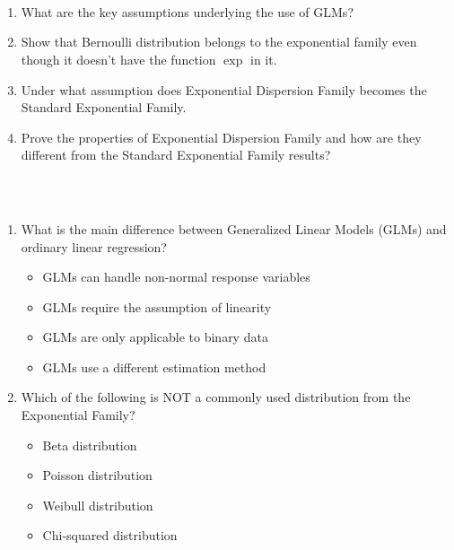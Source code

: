 \documentclass{homework}
\begin{document}
\section{}
\subsection{}\hfill \\
\begin{enumerate}
    \item What are the key assumptions underlying the use of GLMs?
     \item Show that Bernoulli distribution belongs to the exponential family even though it doesn't have the function $\exp$ in it. 
    \item Under what assumption does Exponential Dispersion Family becomes the Standard Exponential Family.
    \item Prove the properties of Exponential Dispersion Family and how are they different from the Standard Exponential Family results?
\end{enumerate}
\subsection{}\hfill \\
\begin{enumerate}
    \item What is the main difference between Generalized Linear Models (GLMs) and ordinary linear regression?
    \begin{itemize}
        \item GLMs can handle non-normal response variables
        \item GLMs require the assumption of linearity
        \item GLMs are only applicable to binary data
        \item GLMs use a different estimation method
    \end{itemize}
    \item Which of the following is NOT a commonly used distribution from the Exponential Family?
    \begin{itemize}
        \item Beta distribution
        \item Poisson distribution
        \item Weibull distribution
        \item Chi-squared distribution
    \end{itemize}
\end{enumerate}
\end{document}

